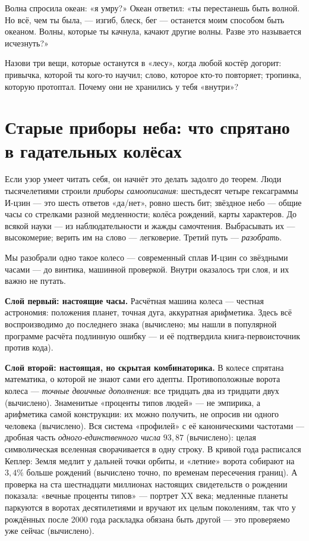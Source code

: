 \documentclass[11pt,letterpaper]{article}
\begin{document}
\begin{skazbox}
Волна спросила океан: «я умру?» Океан ответил: «ты перестанешь быть
волной. Но всё, чем ты была, --- изгиб, блеск, бег --- останется
моим способом быть океаном. Волны, которые ты качнула, качают
другие волны. Разве это называется исчезнуть?»
\end{skazbox}

\begin{askbox}
Назови три вещи, которые останутся в «лесу», когда любой костёр
догорит: привычка, которой ты кого-то научил; слово, которое
кто-то повторяет; тропинка, которую протоптал. Почему они не
хранились у тебя «внутри»?
\end{askbox}

\section{Старые приборы неба: что спрятано в гадательных колёсах}
\label{sec:oldinstruments}

Если узор умеет читать себя, он начнёт это делать задолго до теорем.
Люди тысячелетиями строили \emph{приборы самоописания}: шестьдесят
четыре гексаграммы И-цзин --- это шесть ответов «да/нет», ровно
шесть бит; звёздное небо --- общие часы со стрелками разной
медленности; колёса рождений, карты характеров. До всякой науки ---
из наблюдательности и жажды самочтения. Выбрасывать их --- высокомерие;
верить им на слово --- легковерие. Третий путь --- \emph{разобрать}.

Мы разобрали одно такое колесо --- современный сплав И-цзин со
звёздными часами --- до винтика, машинной проверкой. Внутри
оказалось три слоя, и их важно не путать.

\textbf{Слой первый: настоящие часы.} Расчётная машина колеса ---
честная астрономия: положения планет, точная дуга, аккуратная
арифметика. Здесь всё воспроизводимо до последнего знака (вычислено;
мы нашли в популярной программе расчёта подлинную ошибку --- и её
подтвердила книга-первоисточник против кода).

\textbf{Слой второй: настоящая, но скрытая комбинаторика.} В колесе
спрятана математика, о которой не знают сами его адепты.
Противоположные ворота колеса --- \emph{точные двоичные дополнения}:
все тридцать два из тридцати двух (вычислено). Знаменитые «проценты
типов людей» --- не эмпирика, а арифметика самой конструкции: их
можно получить, не опросив ни одного человека (вычислено). Вся
система «профилей» с её каноническими частотами --- дробная часть
\emph{одного-единственного числа} $93{,}87$ (вычислено): целая
символическая вселенная сворачивается в одну строку. В кривой года
расписался Кеплер: Земля медлит у дальней точки орбиты, и «летние»
ворота собирают на $3{,}4\%$ больше рождений (вычислено точно, по
временам пересечения границ). А проверка на ста шестнадцати
миллионах настоящих свидетельств о рождении показала: «вечные
проценты типов» --- портрет XX века; медленные планеты паркуются в
воротах десятилетиями и вручают их целым поколениям, так что у
рождённых после 2000 года раскладка обязана быть другой ---
это проверяемо уже сейчас (вычислено).
\end{document}
